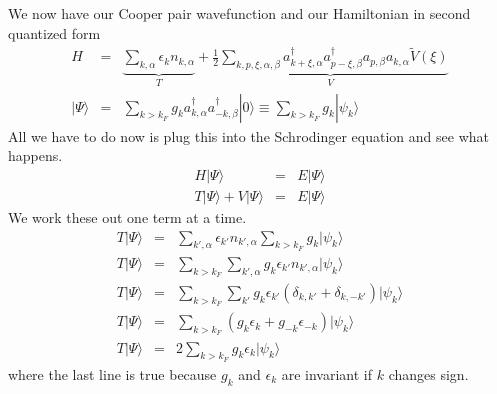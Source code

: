\documentclass{article}
\begin{document}
We now have our Cooper pair wavefunction and our Hamiltonian in second
quantized form\begin{eqnarray*}
H & = & \underbrace{\sum_{k,\alpha}\epsilon_{k}n_{k,\alpha}}_{T}+\underbrace{\frac{1}{2}\sum_{k,p,\xi,\alpha,\beta}a_{k+\xi,\alpha}^{\dagger}a_{p-\xi,\beta}^{\dagger}a_{p,\beta}a_{k,\alpha}\tilde{V}(\xi)}_{V}\\
|\Psi\rangle & = & \sum_{k>k_{F}}g_{k}a_{k,\alpha}^{\dagger}a_{-k,\beta}^{\dagger}|0\rangle\equiv\sum_{k>k_{F}}g_{k}|\psi_{k}\rangle\end{eqnarray*}
All we have to do now is plug this into the Schrodinger equation and
see what happens.\begin{eqnarray*}
H|\Psi\rangle & = & E|\Psi\rangle\\
T|\Psi\rangle+V|\Psi\rangle & = & E|\Psi\rangle\end{eqnarray*}
We work these out one term at a time.\begin{eqnarray*}
T|\Psi\rangle & = & \sum_{k',\alpha}\epsilon_{k'}n_{k',\alpha}\sum_{k>k_{F}}g_{k}|\psi_{k}\rangle\\
T|\Psi\rangle & = & \sum_{k>k_{F}}\sum_{k',\alpha}g_{k}\epsilon_{k'}n_{k',\alpha}|\psi_{k}\rangle\\
T|\Psi\rangle & = & \sum_{k>k_{F}}\sum_{k'}g_{k}\epsilon_{k'}\left(\delta_{k,k'}+\delta_{k,-k'}\right)|\psi_{k}\rangle\\
T|\Psi\rangle & = & \sum_{k>k_{F}}\left(g_{k}\epsilon_{k}+g_{-k}\epsilon_{-k}\right)|\psi_{k}\rangle\\
T|\Psi\rangle & = & 2\sum_{k>k_{F}}g_{k}\epsilon_{k}|\psi_{k}\rangle\end{eqnarray*}
where the last line is true because $g_{k}$ and $\epsilon_{k}$ are
invariant if $k$ changes sign.
\end{document}
